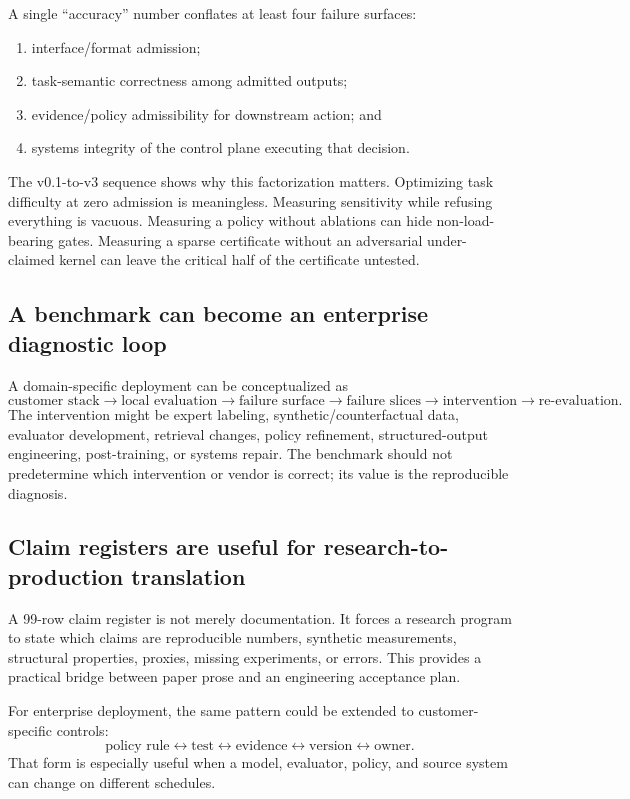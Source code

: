\documentclass[11pt]{article}
\begin{document}
A single ``accuracy'' number conflates at least four failure surfaces:
\begin{enumerate}
  \item interface/format admission;
  \item task-semantic correctness among admitted outputs;
  \item evidence/policy admissibility for downstream action; and
  \item systems integrity of the control plane executing that decision.
\end{enumerate}

The v0.1-to-v3 sequence shows why this factorization matters. Optimizing task difficulty at zero admission is meaningless. Measuring sensitivity while refusing everything is vacuous. Measuring a policy without ablations can hide non-load-bearing gates. Measuring a sparse certificate without an adversarial under-claimed kernel can leave the critical half of the certificate untested.

\subsection{A benchmark can become an enterprise diagnostic loop}

A domain-specific deployment can be conceptualized as
\[
\text{customer stack}
\rightarrow \text{local evaluation}
\rightarrow \text{failure surface}
\rightarrow \text{failure slices}
\rightarrow \text{intervention}
\rightarrow \text{re-evaluation}.
\]
The intervention might be expert labeling, synthetic/counterfactual data, evaluator development, retrieval changes, policy refinement, structured-output engineering, post-training, or systems repair. The benchmark should not predetermine which intervention or vendor is correct; its value is the reproducible diagnosis.

\subsection{Claim registers are useful for research-to-production translation}

A 99-row claim register is not merely documentation. It forces a research program to state which claims are reproducible numbers, synthetic measurements, structural properties, proxies, missing experiments, or errors. This provides a practical bridge between paper prose and an engineering acceptance plan.

For enterprise deployment, the same pattern could be extended to customer-specific controls:
\[
\text{policy rule}\leftrightarrow\text{test}\leftrightarrow\text{evidence}\leftrightarrow\text{version}\leftrightarrow\text{owner}.
\]
That form is especially useful when a model, evaluator, policy, and source system can change on different schedules.
\end{document}
